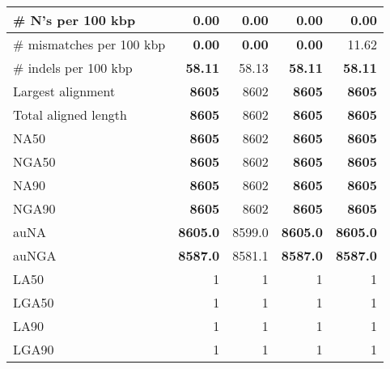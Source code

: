 \documentclass[12pt,a4paper]{article}
\begin{document}
\begin{table}[ht]
\begin{center}
\begin{tabular}{|l*{4}{|r}|}
\# N's per 100 kbp & 0.00 & 0.00 & 0.00 & 0.00 \\ \hline
\# mismatches per 100 kbp & {\bf 0.00} & {\bf 0.00} & {\bf 0.00} & 11.62 \\ \hline
\# indels per 100 kbp & {\bf 58.11} & 58.13 & {\bf 58.11} & {\bf 58.11} \\ \hline
Largest alignment & {\bf 8605} & 8602 & {\bf 8605} & {\bf 8605} \\ \hline
Total aligned length & {\bf 8605} & 8602 & {\bf 8605} & {\bf 8605} \\ \hline
NA50 & {\bf 8605} & 8602 & {\bf 8605} & {\bf 8605} \\ \hline
NGA50 & {\bf 8605} & 8602 & {\bf 8605} & {\bf 8605} \\ \hline
NA90 & {\bf 8605} & 8602 & {\bf 8605} & {\bf 8605} \\ \hline
NGA90 & {\bf 8605} & 8602 & {\bf 8605} & {\bf 8605} \\ \hline
auNA & {\bf 8605.0} & 8599.0 & {\bf 8605.0} & {\bf 8605.0} \\ \hline
auNGA & {\bf 8587.0} & 8581.1 & {\bf 8587.0} & {\bf 8587.0} \\ \hline
LA50 & 1 & 1 & 1 & 1 \\ \hline
LGA50 & 1 & 1 & 1 & 1 \\ \hline
LA90 & 1 & 1 & 1 & 1 \\ \hline
LGA90 & 1 & 1 & 1 & 1 \\ \hline
\end{tabular}
\end{center}
\end{table}
\end{document}
